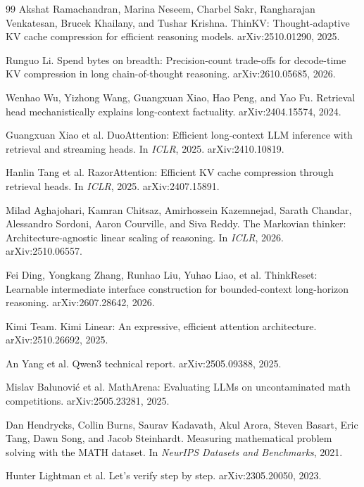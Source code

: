 \documentclass{article}
\begin{document}
\begin{thebibliography}{99}
 Akshat Ramachandran, Marina Neseem, Charbel Sakr, Rangharajan Venkatesan, Brucek Khailany, and Tushar Krishna. ThinKV: Thought-adaptive KV cache compression for efficient reasoning models. arXiv:2510.01290, 2025.

 Runguo Li. Spend bytes on breadth: Precision-count trade-offs for decode-time KV compression in long chain-of-thought reasoning. arXiv:2610.05685, 2026.

 Wenhao Wu, Yizhong Wang, Guangxuan Xiao, Hao Peng, and Yao Fu. Retrieval head mechanistically explains long-context factuality. arXiv:2404.15574, 2024.

 Guangxuan Xiao et al. DuoAttention: Efficient long-context LLM inference with retrieval and streaming heads. In \emph{ICLR}, 2025. arXiv:2410.10819.

 Hanlin Tang et al. RazorAttention: Efficient KV cache compression through retrieval heads. In \emph{ICLR}, 2025. arXiv:2407.15891.

 Milad Aghajohari, Kamran Chitsaz, Amirhossein Kazemnejad, Sarath Chandar, Alessandro Sordoni, Aaron Courville, and Siva Reddy. The Markovian thinker: Architecture-agnostic linear scaling of reasoning. In \emph{ICLR}, 2026. arXiv:2510.06557.

 Fei Ding, Yongkang Zhang, Runhao Liu, Yuhao Liao, et al. ThinkReset: Learnable intermediate interface construction for bounded-context long-horizon reasoning. arXiv:2607.28642, 2026.

 Kimi Team. Kimi Linear: An expressive, efficient attention architecture. arXiv:2510.26692, 2025.

 An Yang et al. Qwen3 technical report. arXiv:2505.09388, 2025.

 Mislav Balunovi\'c et al. MathArena: Evaluating LLMs on uncontaminated math competitions. arXiv:2505.23281, 2025.

 Dan Hendrycks, Collin Burns, Saurav Kadavath, Akul Arora, Steven Basart, Eric Tang, Dawn Song, and Jacob Steinhardt. Measuring mathematical problem solving with the MATH dataset. In \emph{NeurIPS Datasets and Benchmarks}, 2021.

 Hunter Lightman et al. Let's verify step by step. arXiv:2305.20050, 2023.

\end{thebibliography}
\end{document}
